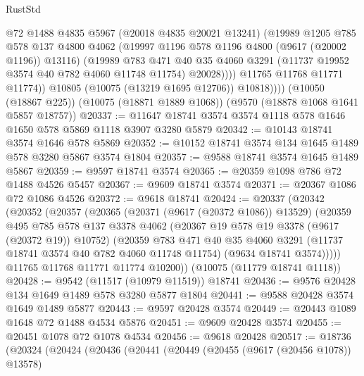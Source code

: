 \begin{lexlean}{RustStd}
\begin{coremodule}
{\begin{coremodule}
{{{{{{{{{{{{{{{{{{{{{{{{{{{{{{{{{                    @72
                    @1488
                    @4835
                    @5967
                    (@20018 @4835 @20021 @13241)
                    (@19989
                      @1205
                      @785
                      @578
                      @137
                      @4800
                      @4062
                      (@19997 @1196 @578 @1196 @4800 (@9617 (@20002 @1196)) @13116)
                      (@19989
                        @783
                        @471
                        @40
                        @35
                        @4060
                        @3291
                        (@11737 @19952 @3574 @40 @782 @4060 @11748 @11754)
                        @20028))))
                @11765
                @11768
                @11771
                @11774))
            @10805
            (@10075 (@13219 @1695 @12706))
            @10818))))
    (@10050 (@18867 @225))
    (@10075 (@18871 @1889 @1068))
    (@9570 (@18878 @1068 @1641 @5857 @18757))
@20337 := @11647 @18741 @3574 @3574 @1118 @578 @1646 @1650 @578 @5869 @1118 @3907 @3280 @5879
@20342 := @10143 @18741 @3574 @1646 @578 @5869
@20352 := @10152 @18741 @3574 @134 @1645 @1489 @578 @3280 @5867 @3574 @1804
@20357 := @9588 @18741 @3574 @1645 @1489 @5867
@20359 := @9597 @18741 @3574
@20365 := @20359 @1098 @786 @72 @1488 @4526 @5457
@20367 := @9609 @18741 @3574
@20371 := @20367 @1086 @72 @1086 @4526
@20372 := @9618 @18741
@20424 := @20337
    (@20342
      (@20352
        (@20357
          (@20365
            (@20371 (@9617 (@20372 @1086)) @13529)
            (@20359
              @495
              @785
              @578
              @137
              @3378
              @4062
              (@20367 @19 @578 @19 @3378 (@9617 (@20372 @19)) @10752)
              (@20359
                @783
                @471
                @40
                @35
                @4060
                @3291
                (@11737 @18741 @3574 @40 @782 @4060 @11748 @11754)
                (@9634 @18741 @3574)))))
        @11765
        @11768
        @11771
        @11774
        @10200))
    (@10075 (@11779 @18741 @1118))
@20428 := @9542 (@11517 (@10979 @11519)) @18741
@20436 := @9576 @20428 @134 @1649 @1489 @578 @3280 @5877 @1804
@20441 := @9588 @20428 @3574 @1649 @1489 @5877
@20443 := @9597 @20428 @3574
@20449 := @20443 @1089 @1648 @72 @1488 @4534 @5876
@20451 := @9609 @20428 @3574
@20455 := @20451 @1078 @72 @1078 @4534
@20456 := @9618 @20428
@20517 := @18736
    (@20324
      (@20424
        (@20436
          (@20441
            (@20449
              (@20455 (@9617 (@20456 @1078)) @13578)
}}}}}}}}}}}}}}}}}}}}}}}}}}}}}}}}}
\end{coremodule}}
\end{coremodule}
\end{lexlean}
